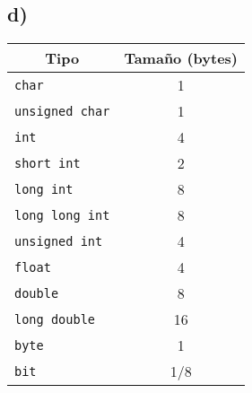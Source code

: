 \documentclass[10pt]{article}
\begin{document}
        \subsection*{d)}
        \begin{table}[h]
        \centering
        \begin{tabular}{|l|c|} 
        \hline
        \multicolumn{1}{|c|}{\textbf{Tipo}} & \textbf{Tamaño (bytes)}  \\ 
        \hline
        \texttt{char}                                & 1                        \\ 
        \hline
        \texttt{unsigned char}                       & 1                        \\ 
        \hline
        \texttt{int}                                 & 4                        \\ 
        \hline
        \texttt{short int}                           & 2                        \\ 
        \hline
        \texttt{long int}                            & 8                        \\ 
        \hline
        \texttt{long long int}                       & 8                        \\ 
        \hline
        \texttt{unsigned int}                        & 4                        \\ 
        \hline
        \texttt{float}                               & 4                        \\ 
        \hline
        \texttt{double}                              & 8                        \\ 
        \hline
        \texttt{long double}                         & 16                       \\
        \hline
        \texttt{byte}                         & 1                       \\
        \hline
        \texttt{bit}                         & 1/8                       \\
        \hline
        \end{tabular}
        \end{table}
\end{document}
